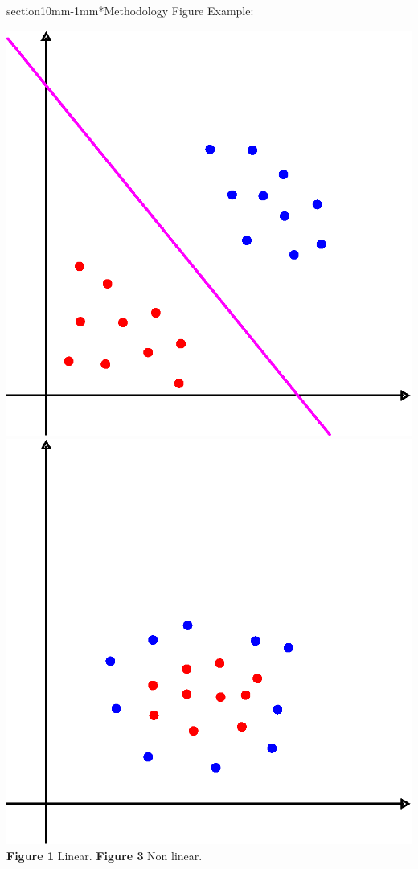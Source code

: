 \documentclass[a0,portrait]{a0poster}
\makeatletter
\renewcommand{\LARGE}{\fontsize{50}{70}\selectfont\bfseries} %
\renewcommand{\section}{\@startsection%
  {section}{1}{0mm}{-\baselineskip}{1mm}{\LARGE\color{myred}\bfseries}}
\makeatother
\begin{document}
\begin{multicols}{2}
\section*{Methodology}
Figure Example:
\begin{center}
	\includegraphics[scale=0.5]{svmfig2_margemrigida.eps}\hspace{1.5cm}
	\hspace{1.5cm}\includegraphics[scale=0.5]{svmfig2_naolinear.eps}
	\\
	\hspace{2cm}\textbf{Figure 1} \textcolor{myblue}{Linear.}\hspace{2cm}
	\hspace{1.5cm}\textbf{Figure 3}  \textcolor{myblue}{Non linear.}
\end{center}

\end{multicols}
\end{document}
